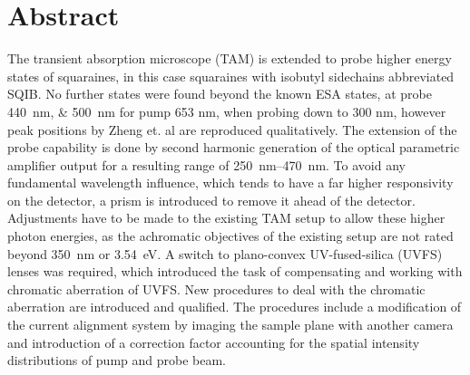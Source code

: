 \documentclass[twoside,openright,listof=numbered]{scrreprt}
\begin{document}
\nobibliography*







\printthesistitle


\chapter*{Abstract}
The transient absorption microscope (TAM) is extended to probe higher energy states of squaraines, in this case squaraines with isobutyl sidechains abbreviated SQIB. No further states were found beyond the known ESA states, at probe \SIlist{440;500}{\nano\meter} for  pump 653 nm, when probing down to 300 nm, however peak positions by Zheng et. al\cite{Zheng2020} are reproduced qualitatively. The extension of the probe capability is done by second harmonic generation of the optical parametric amplifier output for a resulting range of \SIrange{250}{470}{\nano\meter}. To avoid any fundamental wavelength influence, which tends to have a far higher responsivity on the detector, a prism is introduced to remove it ahead of the detector. Adjustments have to be made to the existing TAM setup to allow these higher photon energies, as the achromatic objectives of the existing setup are not rated beyond \qty{350}{\nano\meter} or \qty{3.54}{\electronvolt}. A switch to plano-convex UV-fused-silica (UVFS) lenses was required, which introduced the task of compensating and working with chromatic aberration of UVFS. New procedures to deal with the chromatic aberration are introduced and qualified. The procedures include a modification of the current alignment system by imaging the sample plane with another camera and introduction of a correction factor accounting for the spatial intensity distributions of pump and probe beam.
\end{document}
